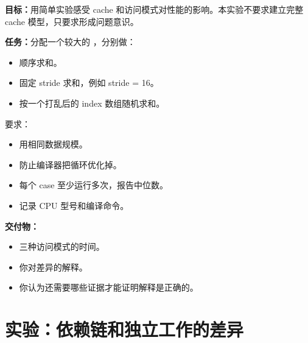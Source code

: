 \begin{labbox}
\textbf{目标：}用简单实验感受 cache 和访问模式对性能的影响。本实验不要求建立完整 cache 模型，只要求形成问题意识。

\textbf{任务：}分配一个较大的 ，分别做：

\begin{itemize}
  \item 顺序求和。
  \item 固定 stride 求和，例如 stride = 16。
  \item 按一个打乱后的 index 数组随机求和。
\end{itemize}

要求：

\begin{itemize}
  \item 用相同数据规模。
  \item 防止编译器把循环优化掉。
  \item 每个 case 至少运行多次，报告中位数。
  \item 记录 CPU 型号和编译命令。
\end{itemize}

\textbf{交付物：}

\begin{itemize}
  \item 三种访问模式的时间。
  \item 你对差异的解释。
  \item 你认为还需要哪些证据才能证明解释是正确的。
\end{itemize}
\end{labbox}

\section{实验：依赖链和独立工作的差异}

